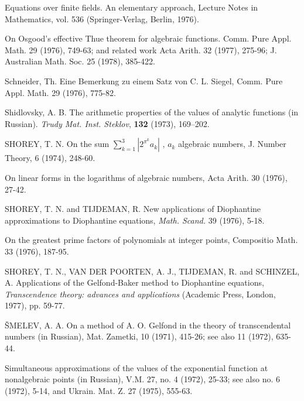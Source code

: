 \begin{hanglist}
    \item \hspace{1.5em} Equations over finite fields. An elementary approach, Lecture Notes in Mathematics, vol. 536 (Springer-Verlag, Berlin, 1976).
    \item \hspace{1.5em} On Osgood's effective Thue theorem for algebraic functions. Comm. Pure Appl. Math. 29 (1976), 749-63; and related work Acta Arith. 32 (1977), 275-96; J. Australian Math. Soc. 25 (1978), 385-422.
    \item Schneider, Th. Eine Bemerkung zu einem Satz von C. L. Siegel, Comm. Pure Appl. Math. 29 (1976), 775-82.
    \item Shidlovsky, A. B. The arithmetic properties of the values of analytic functions (in Russian). \textit{Trudy Mat. Inst. Steklov}, \textbf{132} (1973), 169–202.
    \item SHOREY, T. N. On the sum  $\sum_{k=1}^{3} |2^{\pi^k} a_k|$ ,  $a_k$  algebraic numbers, J. Number Theory, 6 (1974), 248-60.
    \item On linear forms in the logarithms of algebraic numbers, Acta Arith. 30 (1976), 27-42.
    \item SHOREY, T. N. and TIJDEMAN, R. New applications of Diophantine approximations to Diophantine equations, \textit{Math. Scand.} 39 (1976), 5-18.
    \item \hspace{1.5em} On the greatest prime factors of polynomials at integer points, Compositio Math. 33 (1976), 187-95.
    \item SHOREY, T. N., VAN DER POORTEN, A. J., TIJDEMAN, R. and SCHINZEL, A. Applications of the Gelfond-Baker method to Diophantine equations, \textit{Transcendence theory: advances and applications} (Academic Press, London, 1977), pp. 59-77.
    \item ŠMELEV, A. A. On a method of A. O. Gelfond in the theory of transcendental numbers (in Russian), Mat. Zametki, 10 (1971), 415-26; see also 11 (1972), 635-44.
    \item \hspace{1.5em} Simultaneous approximations of the values of the exponential function at nonalgebraic points (in Russian), V.M. 27, no. 4 (1972), 25-33; see also no. 6 (1972), 5-14, and Ukrain. Mat. Z. 27 (1975), 555-63.

\end{hanglist}
